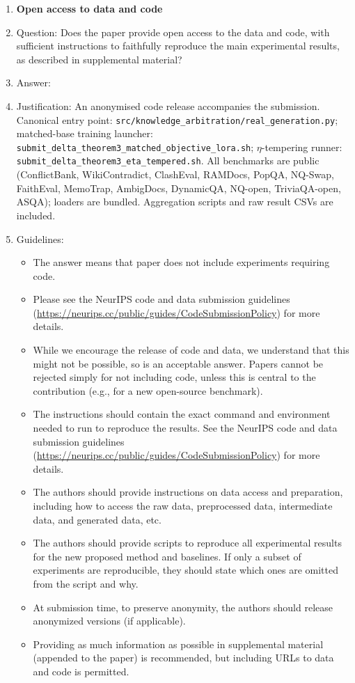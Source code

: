 \begin{enumerate}
\item \textbf{Open access to data and code}
    \item[] Question: Does the paper provide open access to the data and code, with sufficient instructions to faithfully reproduce the main experimental results, as described in supplemental material?
    \item[] Answer: \answerYes{}
    \item[] Justification: An anonymised code release accompanies the submission. Canonical entry point: \texttt{src/knowledge\_arbitration/real\_generation.py}; matched-base training launcher: \texttt{submit\_delta\_theorem3\_matched\_objective\_lora.sh}; $\eta$-tempering runner: \texttt{submit\_delta\_theorem3\_eta\_tempered.sh}. All benchmarks are public (ConflictBank, WikiContradict, ClashEval, RAMDocs, PopQA, NQ-Swap, FaithEval, MemoTrap, AmbigDocs, DynamicQA, NQ-open, TriviaQA-open, ASQA); loaders are bundled. Aggregation scripts and raw result CSVs are included.
    \item[] Guidelines:
    \begin{itemize}
        \item The answer \answerNA{} means that paper does not include experiments requiring code.
        \item Please see the NeurIPS code and data submission guidelines (\url{https://neurips.cc/public/guides/CodeSubmissionPolicy}) for more details.
        \item While we encourage the release of code and data, we understand that this might not be possible, so \answerNo{} is an acceptable answer. Papers cannot be rejected simply for not including code, unless this is central to the contribution (e.g., for a new open-source benchmark).
        \item The instructions should contain the exact command and environment needed to run to reproduce the results. See the NeurIPS code and data submission guidelines (\url{https://neurips.cc/public/guides/CodeSubmissionPolicy}) for more details.
        \item The authors should provide instructions on data access and preparation, including how to access the raw data, preprocessed data, intermediate data, and generated data, etc.
        \item The authors should provide scripts to reproduce all experimental results for the new proposed method and baselines. If only a subset of experiments are reproducible, they should state which ones are omitted from the script and why.
        \item At submission time, to preserve anonymity, the authors should release anonymized versions (if applicable).
        \item Providing as much information as possible in supplemental material (appended to the paper) is recommended, but including URLs to data and code is permitted.
    \end{itemize}


\end{enumerate}
